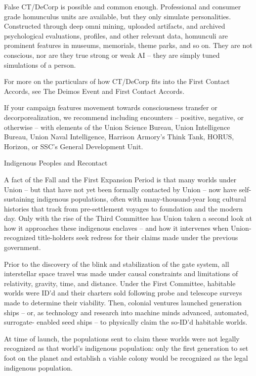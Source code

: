 False CT/DeCorp is possible and common enough. Professional and consumer grade  
homunculus units are available, but they only simulate personalities. Constructed through deep  
omni mining, uploaded artifacts, and archived psychological evaluations, profiles, and other  
relevant data, homunculi are prominent features in museums, memorials, theme parks, and so  
on. They are not conscious, nor are they true strong or weak AI -- they are simply tuned  
simulations of a person. 
 

For more on the particulars of how CT/DeCorp fits into the First Contact Accords, see The  
Deimos Event and First Contact Accords. 
 

If your campaign features movement towards consciousness transfer or decorporealization, we  
recommend including encounters -- positive, negative, or otherwise -- with elements of the  
Union Science Bureau, Union Intelligence Bureau, Union Naval Intelligence, Harrison Armory’s  
Think Tank, HORUS, Horizon, or SSC’s General Development Unit.  
 

                                                                                                               


Indigenous Peoples and Recontact  

A fact of the Fall and the First Expansion Period is that many worlds under Union -- but that have  
not yet been formally contacted by Union -- now have self-sustaining indigenous populations,  
often with many-thousand-year long cultural histories that track from pre-settlement voyages to  
foundation and the modern day. Only with the rise of the Third Committee has Union taken a  
second look at how it approaches these indigenous enclaves -- and how it intervenes when  
Union-recognized title-holders seek redress for their claims made under the previous  
government.  
 

Prior to the discovery of the blink and stabilization of the gate system, all interstellar space travel  
was made under causal constraints and limitations of relativity, gravity, time, and distance. Under  
the First Committee, habitable worlds were ID’d and their charters sold following probe and  
telescope surveys made to determine their viability. Then, colonial ventures launched generation  
ships -- or, as technology and research into machine minds advanced,  automated, surrogate- 
enabled seed ships -- to physically claim the so-ID’d habitable worlds. 
 

At time of launch, the populations sent to claim these worlds were not legally recognized as that  
world’s indigenous population: only the first generation to set foot on the planet and establish a  
viable colony would be recognized as the legal indigenous population. 
 

